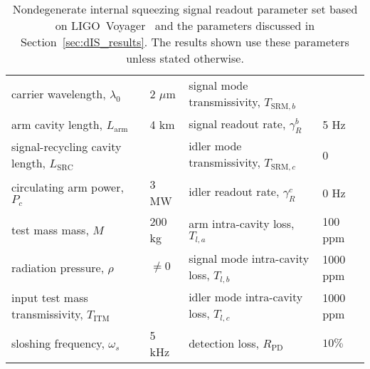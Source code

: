 \begin{table}[]
\centering
\begin{tabular}{@{}ll|ll@{}}
\toprule
carrier wavelength, $\lambda_0$ & 2 $\mu\text{m}$ & signal mode transmissivity, $T_{\text{SRM},b}$ &  \\
arm cavity length, $L_\text{arm}$ & 4 km & signal readout rate, $\gamma^b_R$ & 5 Hz \\
signal-recycling cavity length, $L_\text{SRC}$ &  & idler mode transmissivity, $T_{\text{SRM},c}$ & 0 \\
circulating arm power, $P_c$ & 3 MW & idler readout rate, $\gamma^c_R$ & 0 Hz \\
test mass mass, $M$ & 200 kg & arm intra-cavity loss, $T_{l,a}$ & 100 ppm \\
radiation pressure, $\rho$ & $\neq0$ & signal mode intra-cavity loss, $T_{l,b}$ & 1000 ppm \\
input test mass transmissivity, $T_\text{ITM}$ &  & idler mode intra-cavity loss, $T_{l,c}$ & 1000 ppm \\
sloshing frequency, $\omega_s$ & 5 kHz & detection loss, $R_\text{PD}$ & $10\%$ \\ \bottomrule
\end{tabular}
\caption{ Nondegenerate internal squeezing signal readout parameter set based on LIGO~Voyager~\cite{} and the parameters discussed in Section~\ref{sec:dIS_results}. The results shown use these parameters unless stated otherwise.}
\label{tab:signal_RO_parameters}
\end{table}

